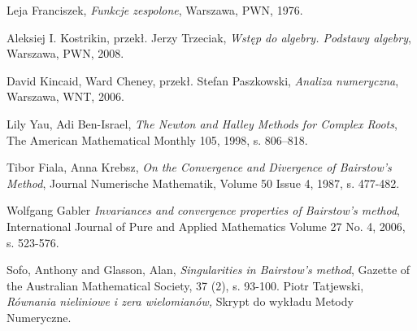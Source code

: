 \documentclass{article}
\begin{document}
\begin{thebibliography}{99}
 Leja Franciszek,
\emph{Funkcje zespolone},
Warszawa, PWN, 1976.

 Aleksiej I. Kostrikin, przekł. Jerzy Trzeciak,
\emph{Wstęp do algebry. Podstawy algebry},
Warszawa, PWN, 2008.

 David Kincaid, Ward Cheney, przekł. Stefan Paszkowski,
\emph{Analiza numeryczna},
Warszawa, WNT, 2006.

Lily Yau, Adi Ben-Israel,
\emph{The Newton and Halley Methods for Complex Roots},
The American Mathematical Monthly 105, 1998, s. 806–818.

Tibor Fiala, Anna Krebsz,
\emph{On the Convergence and Divergence of Bairstow's Method},
Journal Numerische Mathematik, Volume 50 Issue 4, 1987, s. 477-482.

Wolfgang Gabler
\emph{Invariances and convergence properties of Bairstow's method},
International Journal of Pure and Applied Mathematics Volume 27 No. 4, 2006, s. 523-576.

Sofo, Anthony and Glasson, Alan,
\emph{Singularities in Bairstow’s method},
Gazette of the Australian Mathematical Society, 37 (2), s. 93-100.
Piotr Tatjewski,
\emph{Równania nieliniowe i zera wielomianów,}
Skrypt do wykładu Metody Numeryczne.

\end{thebibliography}
\end{document}
